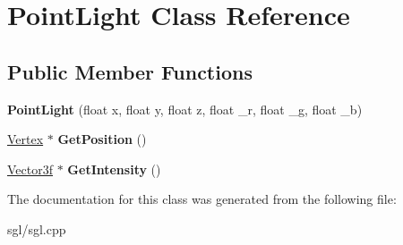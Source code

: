 \hypertarget{class_point_light}{}\section{Point\+Light Class Reference}
\label{class_point_light}
\subsection*{Public Member Functions}
\begin{DoxyCompactItemize}
\item 
\mbox{\label{class_point_light_a62f5a67c145c369d4dc3b6b74f7b4905}} 
{\bfseries Point\+Light} (float x, float y, float z, float \+\_\+r, float \+\_\+g, float \+\_\+b)
\item 
\mbox{\label{class_point_light_a3a312a3daa19fb015586c3fdc57b7b5f}} 
\hyperlink{class_vertex}{Vertex} $\ast$ {\bfseries Get\+Position} ()
\item 
\mbox{\label{class_point_light_af030c584752d3c91299e32b25346a30e}} 
\hyperlink{class_vector3f}{Vector3f} $\ast$ {\bfseries Get\+Intensity} ()
\end{DoxyCompactItemize}


The documentation for this class was generated from the following file\+:\begin{DoxyCompactItemize}
\item 
sgl/sgl.\+cpp\end{DoxyCompactItemize}
